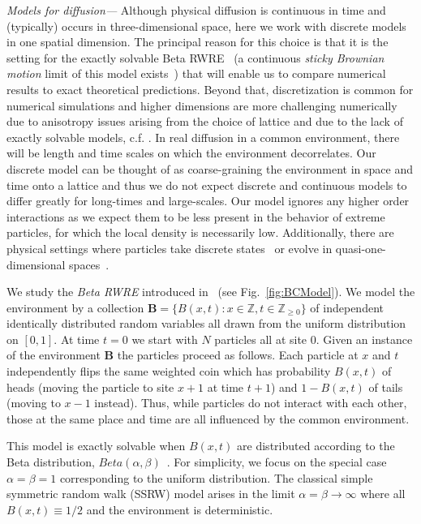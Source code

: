 \documentclass[%
 reprint,
 amsmath,amssymb,
 longbibliography,
 aps,
prl
]{revtex4-1}
\begin{document}
\medskip
\noindent\emph{Models for diffusion---}
Although physical diffusion is continuous in time and (typically) occurs in three-dimensional space, here we work with discrete models in one spatial dimension. The principal reason for this choice is that it is the setting for the exactly solvable  Beta RWRE~\cite{barraquandRandomwalkBetadistributedRandom2017a} (a continuous {\it sticky Brownian motion} limit of this model exists~\cite{barraquandLargeDeviationsSticky2020}) that will enable us to compare numerical results to exact theoretical predictions.
Beyond that, discretization is common for numerical simulations and higher dimensions are more challenging numerically due to anisotropy issues arising from the choice of lattice and due to the lack of exactly solvable models, c.f. \cite{ledoussalDiffusionTimedependentRandom2017}. In real diffusion in a common environment, there will be length and time scales on which the environment decorrelates.  Our discrete model can be thought of as coarse-graining the environment in space and time onto a lattice and thus we do not expect discrete and continuous models to differ greatly for long-times and large-scales. Our model ignores any higher order interactions as we expect them to be less present in the behavior of extreme particles, for which the local density is necessarily low. Additionally, there are physical settings where particles take discrete states~\cite{fellerDiffusionProcessesGenetics1951, moranRandomProcessesGenetics1958} or evolve in quasi-one-dimensional spaces~\cite{pollardGaseousSelfDiffusionLong1948,ahmadiDiffusionQuasionedimensionalChannels2017}.

We study the {\it Beta RWRE} introduced in~\cite{barraquandRandomwalkBetadistributedRandom2017a} (see Fig.~\ref{fig:BCModel}). We model the environment by a collection $\mathbf{B}= \big\{B(x,t):x\in \mathbb{Z},t\in \mathbb{Z}_{\geq 0}\big\}$ of independent identically distributed random variables all drawn from the uniform distribution on $[0,1]$. At time $t=0$ we start with $N$ particles all at site $0$. Given an instance of the environment $\mathbf{B}$ the particles proceed as follows. Each particle at $x$ and $t$ independently flips the same weighted coin which has probability $B(x,t)$ of heads (moving the particle to site $x+1$ at time $t+1$) and $1-B(x,t)$ of tails (moving to $x-1$ instead). Thus, while particles do not interact with each other, those at the same place and time are all influenced by the common environment.

This model is exactly solvable when $B(x,t)$ are distributed according to the Beta distribution, $Beta(\alpha, \beta)$~\cite{barraquandRandomwalkBetadistributedRandom2017a}. For simplicity, we focus on the special case $\alpha=\beta=1$ corresponding to the uniform distribution. The classical simple symmetric random walk (SSRW) model arises in the limit $\alpha=\beta\to \infty$ where all $B(x,t)\equiv 1/2$ and the environment is deterministic.
\end{document}
